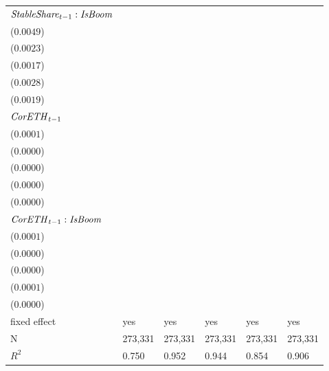 \begin{tabular}{llllll}
${\it StableShare}_{t-1}:{\it IsBoom}$  &   \makecell{$-0.0105^{**}$ \\ ($0.0049$)} &  \makecell{$-0.0093^{***}$ \\ ($0.0023$)} &  \makecell{$-0.0046^{***}$ \\ ($0.0017$)} &  \makecell{$-0.0150^{***}$ \\ ($0.0028$)} &  \makecell{$-0.0061^{***}$ \\ ($0.0019$)} \\
${\it CorETH}_{t-1}$                    &  \makecell{$-0.0004^{***}$ \\ ($0.0001$)} &    \makecell{$0.0001^{**}$ \\ ($0.0000$)} &      \makecell{$0.0000^{}$ \\ ($0.0000$)} &     \makecell{$-0.0000^{}$ \\ ($0.0000$)} &    \makecell{$-0.0001^{*}$ \\ ($0.0000$)} \\
${\it CorETH}_{t-1}:{\it IsBoom}$       &      \makecell{$0.0001^{}$ \\ ($0.0001$)} &  \makecell{$-0.0001^{***}$ \\ ($0.0000$)} &   \makecell{$-0.0001^{**}$ \\ ($0.0000$)} &      \makecell{$0.0000^{}$ \\ ($0.0001$)} &     \makecell{$-0.0000^{}$ \\ ($0.0000$)} \\
\midrule fixed effect                   &                                       yes &                                       yes &                                       yes &                                       yes &                                       yes \\
N                                       &                                   273,331 &                                   273,331 &                                   273,331 &                                   273,331 &                                   273,331 \\
$R^2$                                   &                                     0.750 &                                     0.952 &                                     0.944 &                                     0.854 &                                     0.906 \\
\bottomrule
\end{tabular}
